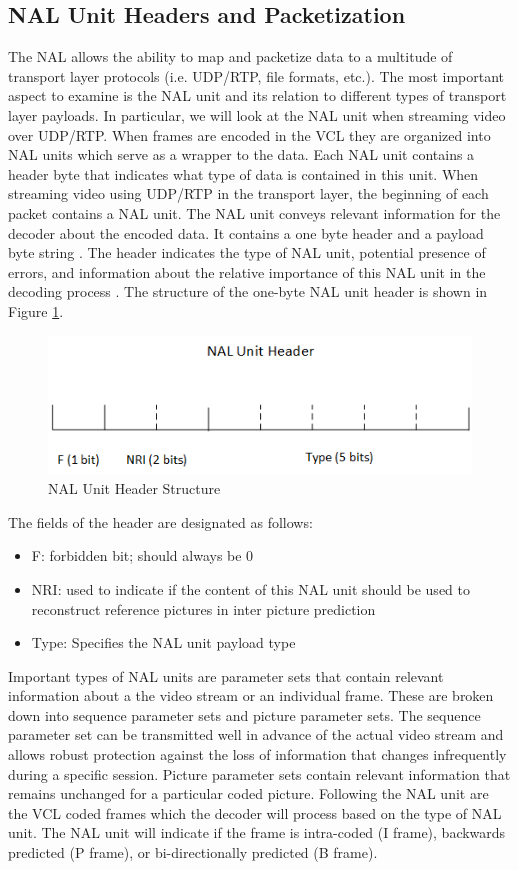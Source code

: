 \documentclass[3p,times,procedia]{elsarticle}
\begin{document}
\subsection{NAL Unit Headers and Packetization}
\label{sec:NALandPacketization}

The NAL allows the ability to map and packetize data to a multitude of transport layer protocols (i.e. UDP/RTP, file formats, etc.). The most important aspect to examine is the NAL unit and its relation to different types of transport layer payloads. In particular, we will look at the NAL unit when streaming video over UDP/RTP. When frames are encoded in the VCL they are organized into NAL units which serve as a wrapper to the data. Each NAL unit contains a header byte that indicates what type of data is contained in this unit. When streaming video using UDP/RTP in the transport layer, the beginning of each packet contains a NAL unit. The NAL unit conveys relevant information for the decoder about the encoded data. It contains a one byte header and a payload byte string \cite{RTP}. The header indicates the type of NAL unit, potential presence of errors, and information about the relative importance of this NAL unit in the decoding process \cite{RTP}. The structure of the one-byte NAL unit header is shown in Figure \ref{fig:NALHeaderStructure}.
\begin{figure}[H]
\centering
\includegraphics[width=0.55\linewidth]{NALUnitHeader.png}
\caption{NAL Unit Header Structure}
\label{fig:NALHeaderStructure}
\end{figure}
The fields of the header are designated as follows:
\begin{itemize}
\item F: forbidden bit; should always be 0
\item NRI: used to indicate if the content of this NAL unit should be used to reconstruct reference pictures in inter picture prediction
\item Type: Specifies the NAL unit payload type
\end{itemize}

Important types of NAL units are parameter sets that contain relevant information about a the video stream or an individual frame. These are broken down into sequence parameter sets and picture parameter sets. The sequence parameter set can be transmitted well in advance of the actual video stream and allows robust protection against the loss of information that changes infrequently during a specific session. Picture parameter sets contain relevant information that remains unchanged for a particular coded picture. Following the NAL unit are the VCL coded frames which the decoder will process based on the type of NAL unit. The NAL unit will indicate if the frame is intra-coded (I frame), backwards predicted (P frame), or bi-directionally predicted (B frame).
\end{document}
